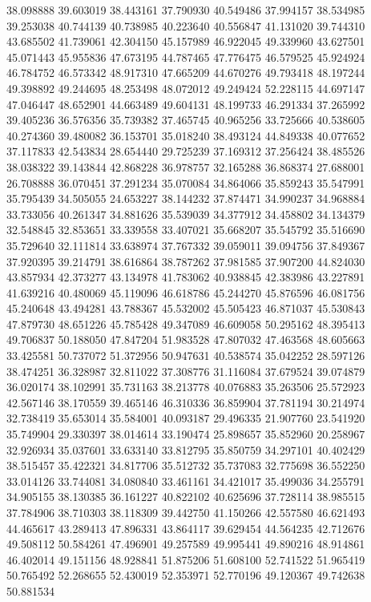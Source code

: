 38.098888
39.603019
38.443161
37.790930
40.549486
37.994157
38.534985
39.253038
40.744139
40.738985
40.223640
40.556847
41.131020
39.744310
43.685502
41.739061
42.304150
45.157989
46.922045
49.339960
43.627501
45.071443
45.955836
47.673195
44.787465
47.776475
46.579525
45.924924
46.784752
46.573342
48.917310
47.665209
44.670276
49.793418
48.197244
49.398892
49.244695
48.253498
48.072012
49.249424
52.228115
44.697147
47.046447
48.652901
44.663489
49.604131
48.199733
46.291334
37.265992
39.405236
36.576356
35.739382
37.465745
40.965256
33.725666
40.538605
40.274360
39.480082
36.153701
35.018240
38.493124
44.849338
40.077652
37.117833
42.543834
28.654440
29.725239
37.169312
37.256424
38.485526
38.038322
39.143844
42.868228
36.978757
32.165288
36.868374
27.688001
26.708888
36.070451
37.291234
35.070084
34.864066
35.859243
35.547991
35.795439
34.505055
24.653227
38.144232
37.874471
34.990237
34.968884
33.733056
40.261347
34.881626
35.539039
34.377912
34.458802
34.134379
32.548845
32.853651
33.339558
33.407021
35.668207
35.545792
35.516690
35.729640
32.111814
33.638974
37.767332
39.059011
39.094756
37.849367
37.920395
39.214791
38.616864
38.787262
37.981585
37.907200
44.824030
43.857934
42.373277
43.134978
41.783062
40.938845
42.383986
43.227891
41.639216
40.480069
45.119096
46.618786
45.244270
45.876596
46.081756
45.240648
43.494281
43.788367
45.532002
45.505423
46.871037
45.530843
47.879730
48.651226
45.785428
49.347089
46.609058
50.295162
48.395413
49.706837
50.188050
47.847204
51.983528
47.807032
47.463568
48.605663
33.425581
50.737072
51.372956
50.947631
40.538574
35.042252
28.597126
38.474251
36.328987
32.811022
37.308776
31.116084
37.679524
39.074879
36.020174
38.102991
35.731163
38.213778
40.076883
35.263506
25.572923
42.567146
38.170559
39.465146
46.310336
36.859904
37.781194
30.214974
32.738419
35.653014
35.584001
40.093187
29.496335
21.907760
23.541920
35.749904
29.330397
38.014614
33.190474
25.898657
35.852960
20.258967
32.926934
35.037601
33.633140
33.812795
35.850759
34.297101
40.402429
38.515457
35.422321
34.817706
35.512732
35.737083
32.775698
36.552250
33.014126
33.744081
34.080840
33.461161
34.421017
35.499036
34.255791
34.905155
38.130385
36.161227
40.822102
40.625696
37.728114
38.985515
37.784906
38.710303
38.118309
39.442750
41.150266
42.557580
46.621493
44.465617
43.289413
47.896331
43.864117
39.629454
44.564235
42.712676
49.508112
50.584261
47.496901
49.257589
49.995441
49.890216
48.914861
46.402014
49.151156
48.928841
51.875206
51.608100
52.741522
51.965419
50.765492
52.268655
52.430019
52.353971
52.770196
49.120367
49.742638
50.881534
